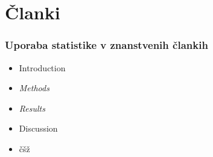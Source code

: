 \section{Članki}
\begin{frame}[fragile]
\frametitle{Uporaba statistike v znanstvenih člankih}
\begin{itemize}
  \item Introduction
  \item \emph{Methods}
  \item \emph{Results}
  \item Discussion
  \item čšž
\end{itemize}
\end{frame}









